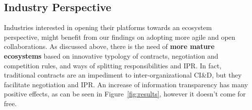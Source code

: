 
\vspace{-.1cm}

\subsection{Industry Perspective}\label{sec:industry}

Industries %
interested in %
opening their platforms towards an ecosystem perspective, %
might benefit from our findings %
on adopting more agile and open collaborations. %
As discussed above, there is the need of {\bf more mature ecosystems} based on innovative typology of contracts, negotiation and competition rules, and ways of splitting responsibilities and IPR. 
In fact, traditional contracts are an impediment to inter-organizational CI\&D, but they facilitate negotiation and IPR. %
An increase of information transparency has many positive effects, as can be seen in Figure~\ref{fig:results}, however it doesn't come for free.

